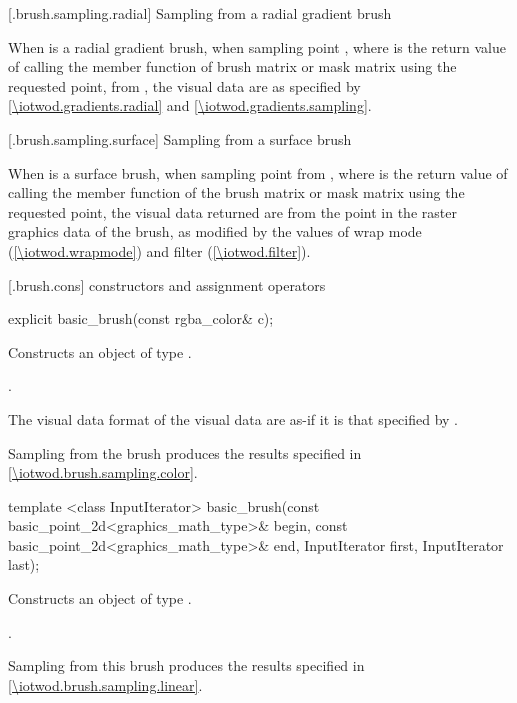  [\iotwod.brush.sampling.radial] {Sampling from a radial gradient brush}

\pnum
When  is a radial gradient brush, when sampling point , where  is the return value of calling the  member function of brush matrix or mask matrix using the requested point, from , the visual data are as specified by \ref{\iotwod.gradients.radial} and \ref{\iotwod.gradients.sampling}.

 [\iotwod.brush.sampling.surface] {Sampling from a surface brush}

\pnum
When  is a surface brush, when sampling point  from , where  is the return value of calling the  member function of the brush matrix or mask matrix using the requested point, the visual data returned are from the point  in the raster graphics data of the brush, as modified by the values of wrap mode (\ref{\iotwod.wrapmode}) and filter (\ref{\iotwod.filter}).

 [\iotwod.brush.cons] { constructors and assignment operators}

%
\begin{itemdecl}
explicit basic_brush(const rgba_color& c);%
\end{itemdecl}
\begin{itemdescr}
\pnum
\effects
Constructs an object of type .

\pnum
\postconditions
{}.

\pnum
\remarks
The visual data format of the visual data are as-if it is that specified by .

\pnum
Sampling from the brush produces the results specified in \ref{\iotwod.brush.sampling.color}.
\end{itemdescr}

%
\begin{itemdecl}
template <class InputIterator>
basic_brush(const basic_point_2d<graphics_math_type>& begin,
  const basic_point_2d<graphics_math_type>& end,
  InputIterator first, InputIterator last);
\end{itemdecl}
\begin{itemdescr}
\pnum
\effects
Constructs an object of type .

\pnum
\postconditions
{}.

\pnum
\remarks
Sampling from this brush produces the results specified in \ref{\iotwod.brush.sampling.linear}.
\end{itemdescr}

